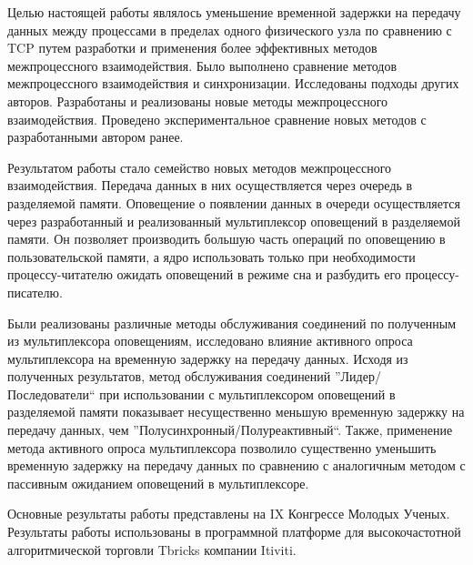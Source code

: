 \startconclusionpage

Целью настоящей работы являлось уменьшение временной задержки на передачу данных между процессами в пределах одного физического узла по сравнению с TCP путем разработки и применения более эффективных методов межпроцессного взаимодействия. Было выполнено сравнение методов межпроцессного взаимодействия и синхронизации. Исследованы подходы других авторов. Разработаны и реализованы новые методы межпроцессного взаимодействия. Проведено экспериментальное сравнение новых методов с разработанными автором ранее.

Результатом работы стало семейство новых методов межпроцессного взаимодействия. Передача данных в них осуществляется через очередь в разделяемой памяти. Оповещение о появлении данных в очереди осуществляется через разработанный и реализованный мультиплексор оповещений в разделяемой памяти. Он позволяет производить большую часть операций по оповещению в пользовательской памяти, а ядро использовать только при необходимости процессу-читателю ожидать оповещений в режиме сна и разбудить его процессу-писателю.

Были реализованы различные методы обслуживания соединений по полученным из мультиплексора оповещениям, исследовано влияние активного опроса мультиплексора на временную задержку на передачу данных. Исходя из полученных результатов, метод обслуживания соединений ''Лидер/Последователи`` при использовании с мультиплексором оповещений в разделяемой памяти показывает несущественно меньшую временную задержку на передачу данных, чем ''Полусинхронный/Полуреактивный``. Также, применение метода активного опроса мультиплексора позволило существенно уменьшить временную задержку на передачу данных по сравнению с аналогичным методом с пассивным ожиданием оповещений в мультиплексоре.

Основные результаты работы представлены на IX Конгрессе Молодых Ученых. Результаты работы использованы в программной платформе для высокочастотной алгоритмической торговли Tbricks компании Itiviti.

